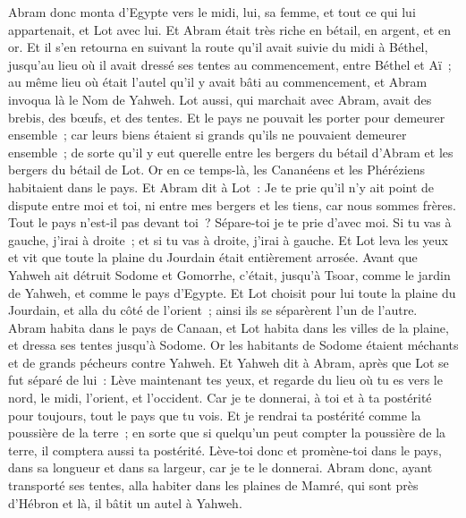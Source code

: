 \begin{multicols}{2}
\VerseOne{}Abram donc monta d'Egypte vers le midi, lui, sa femme, et tout ce qui lui appartenait, et Lot avec lui.
Et Abram était très riche en bétail, en argent, et en or.
Et il s'en retourna en suivant la route qu'il avait suivie du midi à Béthel, jusqu'au lieu où il avait dressé ses tentes au commencement, entre Béthel et Aï~;
au même lieu où était l'autel qu'il y avait bâti au commencement, et Abram invoqua là le Nom de Yahweh.
Lot aussi, qui marchait avec Abram, avait des brebis, des bœufs, et des tentes.
Et le pays ne pouvait les porter pour demeurer ensemble~; car leurs biens étaient si grands qu'ils ne pouvaient demeurer ensemble~;
de sorte qu'il y eut querelle entre les bergers du bétail d'Abram et les bergers du bétail de Lot. Or en ce temps-là, les Cananéens et les Phéréziens habitaient dans le pays.
Et Abram dit à Lot~: Je te prie qu'il n'y ait point de dispute entre moi et toi, ni entre mes bergers et les tiens, car nous sommes frères.
Tout le pays n'est-il pas devant toi~? Sépare-toi je te prie d'avec moi. Si tu vas à gauche, j'irai à droite~; et si tu vas à droite, j'irai à gauche.
Et Lot leva les yeux et vit que toute la plaine du Jourdain était entièrement arrosée. Avant que Yahweh ait détruit Sodome et Gomorrhe, c'était, jusqu'à Tsoar, comme le jardin de Yahweh, et comme le pays d'Egypte.
Et Lot choisit pour lui toute la plaine du Jourdain, et alla du côté de l'orient~; ainsi ils se séparèrent l'un de l'autre.
Abram habita dans le pays de Canaan, et Lot habita dans les villes de la plaine, et dressa ses tentes jusqu'à Sodome.
Or les habitants de Sodome étaient méchants et de grands pécheurs contre Yahweh.
Et Yahweh dit à Abram, après que Lot se fut séparé de lui~: Lève maintenant tes yeux, et regarde du lieu où tu es vers le nord, le midi, l'orient, et l'occident.
Car je te donnerai, à toi et à ta postérité pour toujours, tout le pays que tu vois.
Et je rendrai ta postérité comme la poussière de la terre~; en sorte que si quelqu'un peut compter la poussière de la terre, il comptera aussi ta postérité.
Lève-toi donc et promène-toi dans le pays, dans sa longueur et dans sa largeur, car je te le donnerai.
Abram donc, ayant transporté ses tentes, alla habiter dans les plaines de Mamré, qui sont près d'Hébron et là, il bâtit un autel à Yahweh.

\end{multicols}
